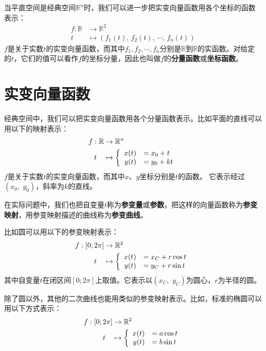\documentclass[12pt,UTF8,fontset=none]{ctexbook}
\begin{document}
当平直空间是经典空间$\mathbb{R}^n$时，我们可以进一步把实变向量函数用各个坐标的函数表示：
\begin{align*}
    f: \mathbb{R} &\rightarrow \mathbb{R}^2 \\
    t\quad &\mapsto (f_1(t),\, f_2(t),\, \cdots ,\, f_n(t))
\end{align*}
$f$是关于实数$t$的实变向量函数，而其中$f_1,f_2, \cdots, f_n$分别是$\mathbb{R}$到$\mathbb{R}$的实函数。对给定的$t$，它们的值可以看作$f$的坐标分量，因此也叫做$f$的\textbf{分量函数}或\textbf{坐标函数}。

\section{实变向量函数}

经典空间中，我们可以把实变向量函数用各个分量函数表示。比如平面的直线可以用以下的映射表示：
\begin{align*}
    f: \mathbb{R} &\rightarrow \mathbb{R}^n \\
    t\quad &\mapsto\left\{
        \begin{array}[]{rl}
            x(t) &= x_0 + t \\
            y(t) &= y_0 + kt \\
        \end{array}
    \right.
\end{align*}
$f$是关于实数$t$的实变向量函数，而其中$x$、$y$坐标分别是$t$的函数。
它表示经过$(x_0,\,\, y_0)$，斜率为$k$的直线。

在实际问题中，我们也把自变量$t$称为\textbf{参变量}或\textbf{参数}，把这样的向量函数称为\textbf{参变映射}，用参变映射描述的曲线称为\textbf{参变曲线}。

比如圆可以用以下的参变映射表示：
\begin{align*}
    f: [0;2\pi] &\rightarrow \mathbb{R}^2 \\
    t\quad &\mapsto\left\{
        \begin{array}[]{rl}
            x(t) &= x_C + r\cos{t} \\
            y(t) &= y_C + r\sin{t} \\
        \end{array}
    \right.
\end{align*}
其中自变量$t$在闭区间$[0;2\pi]$上取值。它表示以$(x_C,\,\, y_C)$为圆心，$r$为半径的圆。

除了圆以外，其他的二次曲线也能用类似的参变映射表示。比如，标准的椭圆可以用以下方式表示：
\begin{align*}
    f: [0;2\pi] &\rightarrow \mathbb{R}^2 \\
    t\quad &\mapsto\left\{
        \begin{array}[]{rl}
            x(t) &= a\cos{t} \\
            y(t) &= b\sin{t} \\
        \end{array}
    \right.
\end{align*}
\end{document}
